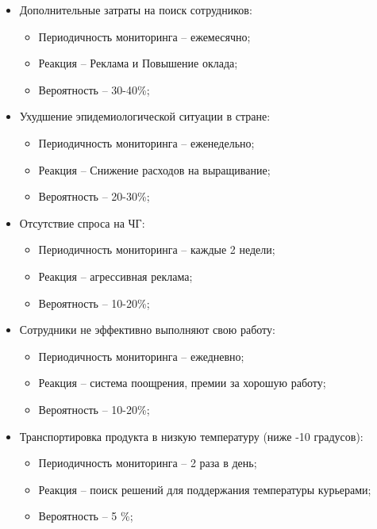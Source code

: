 \documentclass[a4paper,10pt]{article}
\begin{document}
    \begin{itemize}
        \item Дополнительные затраты на поиск сотрудников:
            \begin{itemize}
                \item Периодичность мониторинга -- ежемесячно;
                \item Реакция -- Реклама и Повышение оклада;
                \item Вероятность -- 30-40\%;
            \end{itemize}
        \item Ухудшение эпидемиологической ситуации в стране:
            \begin{itemize}
                \item Периодичность мониторинга -- еженедельно;
                \item Реакция -- Снижение расходов на выращивание;
                \item Вероятность -- 20-30\%;
            \end{itemize}

        \item Отсутствие спроса на ЧГ:
            \begin{itemize}
            \item Периодичность мониторинга -- каждые 2 недели;
            \item Реакция -- агрессивная реклама;
            \item Вероятность -- 10-20\%;
            \end{itemize}

        \item Сотрудники не эффективно выполняют свою работу:
            \begin{itemize}
                \item Периодичность мониторинга -- ежедневно;
                \item Реакция -- система поощрения, премии за хорошую работу;
                \item Вероятность -- 10-20\%;
            \end{itemize}

        \item Транспортировка продукта в низкую температуру (ниже -10 градусов):
            \begin{itemize}
                \item Периодичность мониторинга -- 2 раза в день;
                \item Реакция -- поиск решений для поддержания температуры курьерами;
                \item Вероятность -- 5 \%;
            \end{itemize}

    \end{itemize}
\end{document}
